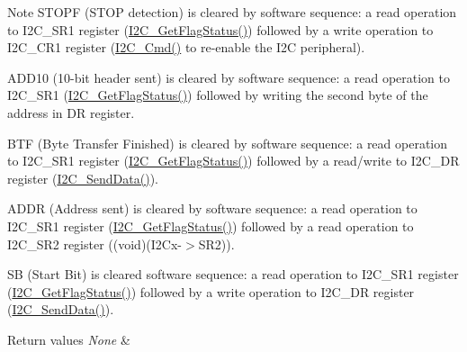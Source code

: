 \begin{DoxyNote}{Note}
S\+T\+O\+PF (S\+T\+OP detection) is cleared by software sequence\+: a read operation to I2\+C\+\_\+\+S\+R1 register (\mbox{\hyperlink{group___i2_c___group5_ga15c95d0ed124f029621a2061b1677ee7}{I2\+C\+\_\+\+Get\+Flag\+Status()}}) followed by a write operation to I2\+C\+\_\+\+C\+R1 register (\mbox{\hyperlink{group___i2_c___group1_ga7e1323c9133c2cb424dfb5b10b7d2f0b}{I2\+C\+\_\+\+Cmd()}} to re-\/enable the I2C peripheral). 

A\+D\+D10 (10-\/bit header sent) is cleared by software sequence\+: a read operation to I2\+C\+\_\+\+S\+R1 (\mbox{\hyperlink{group___i2_c___group5_ga15c95d0ed124f029621a2061b1677ee7}{I2\+C\+\_\+\+Get\+Flag\+Status()}}) followed by writing the second byte of the address in DR register. 

B\+TF (Byte Transfer Finished) is cleared by software sequence\+: a read operation to I2\+C\+\_\+\+S\+R1 register (\mbox{\hyperlink{group___i2_c___group5_ga15c95d0ed124f029621a2061b1677ee7}{I2\+C\+\_\+\+Get\+Flag\+Status()}}) followed by a read/write to I2\+C\+\_\+\+DR register (\mbox{\hyperlink{group___i2_c___group2_ga7bd9e70b8eafde0dd5eb42b0d95fe1a9}{I2\+C\+\_\+\+Send\+Data()}}). 

A\+D\+DR (Address sent) is cleared by software sequence\+: a read operation to I2\+C\+\_\+\+S\+R1 register (\mbox{\hyperlink{group___i2_c___group5_ga15c95d0ed124f029621a2061b1677ee7}{I2\+C\+\_\+\+Get\+Flag\+Status()}}) followed by a read operation to I2\+C\+\_\+\+S\+R2 register ((void)(I2\+Cx-\/$>$S\+R2)). 

SB (Start Bit) is cleared software sequence\+: a read operation to I2\+C\+\_\+\+S\+R1 register (\mbox{\hyperlink{group___i2_c___group5_ga15c95d0ed124f029621a2061b1677ee7}{I2\+C\+\_\+\+Get\+Flag\+Status()}}) followed by a write operation to I2\+C\+\_\+\+DR register (\mbox{\hyperlink{group___i2_c___group2_ga7bd9e70b8eafde0dd5eb42b0d95fe1a9}{I2\+C\+\_\+\+Send\+Data()}}).
\end{DoxyNote}

\begin{DoxyRetVals}{Return values}
{\em None} & \\
\hline
\end{DoxyRetVals}
\mbox{\label{group___i2_c_ga110dda440fa200b5f77349df19b3e6bb}} 

